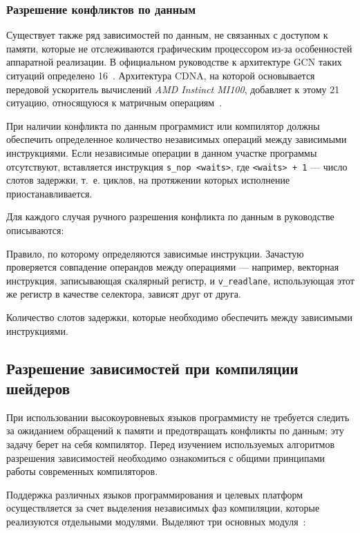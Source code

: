 \documentclass[a4paper,14pt]{extarticle}
\begin{document}
{\subsubsection{Разрешение конфликтов по данным}
\label{section:gcn-wait-states}

Существует также ряд зависимостей по данным, не связанных с доступом к памяти,
которые не отслеживаются графическим процессором из-за особенностей аппаратной реализации.
В официальном руководстве к архитектуре GCN таких ситуаций определено 16~\cite[глава~4.5]{vega-isa}.
Архитектура CDNA, на которой основывается передовой ускоритель вычислений \textit{AMD Instinct MI100},
добавляет к этому 21 ситуацию, относящуюся к матричным операциям~\cite[глава~7.2]{cdna-isa}.

При наличии конфликта по данным программист или компилятор должны обеспечить определенное
количество независимых операций между зависимыми инструкциями. Если независимые операции
в данном участке программы отсутствуют, вставляется инструкция \verb|s_nop <waits>|,
где \verb|<waits> + 1| — число слотов задержки, т.~е. циклов, на протяжении которых
исполнение приостанавливается.

Для каждого случая ручного разрешения конфликта по данным в руководстве описываются:
\begin{ul}
\item Правило, по которому определяются зависимые инструкции. Зачастую проверяется
совпадение операндов между операциями — например, векторная инструкция,
записывающая скалярный регистр, и \verb|v_readlane|, использующая этот же
регистр в качестве селектора, зависят друг от друга.
\item Количество слотов задержки, которые необходимо обеспечить между зависимыми инструкциями.
\end{ul}

\subsection{Разрешение зависимостей при компиляции шейдеров}

При использовании высокоуровневых языков программисту не требуется следить
за ожиданием обращений к памяти и предотвращать конфликты по данным;
эту задачу берет на себя компилятор. Перед изучением используемых алгоритмов
разрешения зависимостей необходимо ознакомиться с общими принципами работы
современных компиляторов.

Поддержка различных языков программирования и целевых платформ осуществляется
за счет выделения независимых фаз компиляции, которые реализуются отдельными модулями.
Выделяют три основных модуля~\cite[глава~1]{compilers}:

}
\end{document}
